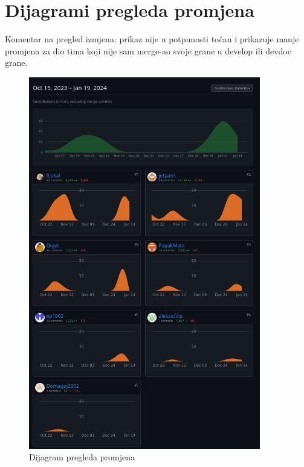 					
		\eject
		\section*{Dijagrami pregleda promjena}

		Komentar na pregled izmjena: prikaz nije u potpunosti točan i prikazuje manje promjena za dio tima koji nije sam merge-ao svoje grane u develop ili devdoc grane.
		
		\begin{figure}[htbp]
			\centering
			\includegraphics[width=0.9\textwidth]{slike/pregled_promjena.png}
			\caption{Dijagram pregleda promjena}
		\label{fig:my_image}
		\end{figure}
		\eject
	